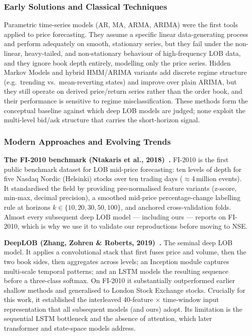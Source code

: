 \documentclass[11pt]{article}
\begin{document}
\subsubsection{Early Solutions and Classical Techniques}
Parametric time-series models (AR, MA, ARMA, ARIMA) were the first tools applied to price forecasting. They
assume a specific linear data-generating process and perform adequately on smooth, stationary series, but
they fail under the non-linear, heavy-tailed, and non-stationary behaviour of high-frequency LOB data, and
they ignore book depth entirely, modelling only the price series. Hidden Markov Models and hybrid HMM/ARIMA
variants add discrete regime structure (e.g.\ trending vs.\ mean-reverting states) and improve over plain
ARIMA, but they still operate on derived price/return series rather than the order book, and their
performance is sensitive to regime misclassification. These methods form the conceptual baseline against
which deep LOB models are judged; none exploit the multi-level bid/ask structure that carries the
short-horizon signal.

\subsubsection{Modern Approaches and Evolving Trends}
\noindent\textbf{The FI-2010 benchmark (Ntakaris et al., 2018)~\cite{fi2010}.} FI-2010 is the first public
benchmark dataset for LOB mid-price forecasting: ten levels of depth for five Nasdaq Nordic (Helsinki) stocks
over ten trading days ($\approx$4\,million events). It standardised the field by providing pre-normalised
feature variants (z-score, min-max, decimal precision), a smoothed mid-price percentage-change labelling rule
at horizons $k\in\{10,20,30,50,100\}$, and anchored cross-validation folds. Almost every subsequent deep LOB
model --- including ours --- reports on FI-2010, which is why we use it to validate our reproductions before
moving to NSE.

\noindent\textbf{DeepLOB (Zhang, Zohren \& Roberts, 2019)~\cite{deeplob}.} The seminal deep LOB model. It
applies a convolutional stack that first fuses price and volume, then the two book sides, then aggregates
across levels; an Inception module captures multi-scale temporal patterns; and an LSTM models the resulting
sequence before a three-class softmax. On FI-2010 it substantially outperformed earlier shallow methods and
generalised to London Stock Exchange stocks. Crucially for this work, it established the interleaved
40-feature $\times$ time-window input representation that all subsequent models (and ours) adopt. Its
limitation is the sequential LSTM bottleneck and the absence of attention, which later transformer and
state-space models address.
\end{document}
